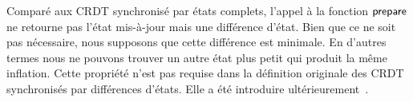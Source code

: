Comparé aux \ac{CRDT} synchronisé par états complets, l'appel à la fonction $\operatorname{\mathsf{prepare}}$ ne retourne pas l'état mis-à-jour mais une différence d'état.
Bien que ce ne soit pas nécessaire, nous supposons que cette différence est minimale.
En d'autres termes nous ne pouvons trouver un autre état plus petit qui produit la même inflation.
Cette propriété n'est pas requise dans la définition originale des \ac{CRDT} synchronisés par différences d'états.
Elle a été introduire ultérieurement~\autocite{enes_2018_efficient-sync-state-based-crdt}.


